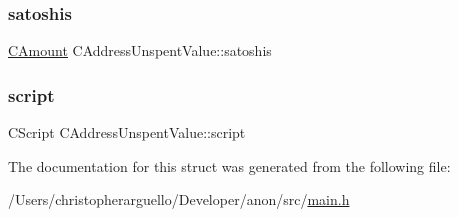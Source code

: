 \subsubsection{\texorpdfstring{satoshis}{satoshis}}
{\footnotesize\ttfamily \mbox{\hyperlink{amount_8h_a4eaf3a5239714d8c45b851527f7cb564}{C\+Amount}} C\+Address\+Unspent\+Value\+::satoshis}

\mbox{\label{struct_c_address_unspent_value_a0e3d5ce980dffae8eab06546dd69d869}} 
\subsubsection{\texorpdfstring{script}{script}}
{\footnotesize\ttfamily C\+Script C\+Address\+Unspent\+Value\+::script}



The documentation for this struct was generated from the following file\+:\begin{DoxyCompactItemize}
\item 
/\+Users/christopherarguello/\+Developer/anon/src/\mbox{\hyperlink{main_8h}{main.\+h}}\end{DoxyCompactItemize}
